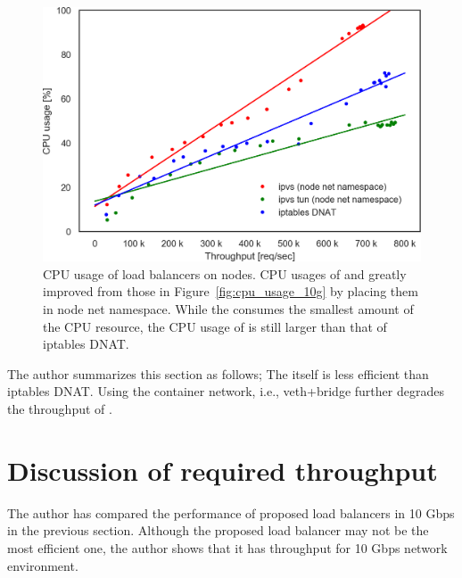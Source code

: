 \begin{figure}[h]
  \centering
  \includegraphics[width=0.8\columnwidth]{Figs/cpu_usage_10g_node_ns}
  \par\bigskip
  \centering
  \begin{minipage}{0.9\columnwidth}
    \caption[CPU usage of load balancers on nodes]{
      CPU usage of load balancers on nodes.
      CPU usages of  and  greatly improved from those in Figure~\ref{fig:cpu_usage_10g} by placing them in node net namespace.  
      While the  consumes the smallest amount of the CPU resource, the CPU usage of  is still larger than that of iptables DNAT.
    }
    \label{fig:cpu_usage_10g_node_ns}
  \end{minipage}
\end{figure}

The author summarizes this section as follows;
The  itself is less efficient than iptables DNAT.
Using the container network, i.e., veth+bridge further degrades the throughput of .

\FloatBarrier

\section{Discussion of required throughput}

The author has compared the performance of proposed load balancers in 10 Gbps in the previous section.
Although the proposed load balancer may not be the most efficient one,  the author shows that it has  throughput for 10 Gbps network environment.


